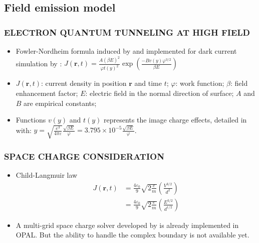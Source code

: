 \documentclass{beamer}
\begin{document}
\subsection{Field emission model}
\begin{frame}
\frametitle{ELECTRON QUANTUM TUNNELING AT HIGH FIELD}
\begin{itemize}
\item Fowler-Nordheim formula induced by \cite{FN} and implemented for dark current simulation by \cite{DE}: $J(\mathbf{r},t) = \frac{A(\beta E)^2}{\varphi t(y)^2}\exp{(\frac{-B v(y)\varphi^{3/2}}{\beta E})}$
\pause
\item $J(\mathbf{r},t)$: current density in position $\mathbf{r}$ and time $t$; $\varphi$: work function; $\beta$: field enhancement factor; $E$: electric field in the normal direction of surface; $A$ and $B$ are empirical constants;  
\pause
\item Functions $v(y)$ and $t(y)$ represents the image charge effects, detailed in \cite{BC} with: $y = \sqrt{\frac{e^3}{4\pi\varepsilon}}\frac{\sqrt{\beta E}}{\varphi} = 3.795\times10^{-5}\frac{\sqrt{\beta E}}{\varphi}$.
\end{itemize}
\end{frame}
\begin{frame}
\frametitle{SPACE CHARGE CONSIDERATION}
\begin{itemize}
\item Child-Langmuir law
\pause
\begin{align*}
J(\mathbf{r},t) & =\frac{4\varepsilon_0}{9}\sqrt{2\frac{e}{m}}(\frac{V^{3/2}}{d^2})\\
 & =\frac{4\varepsilon_0}{9}\sqrt{2\frac{e}{m}}(\frac{E^{3/2}}{d^{1/2}})
\end{align*}
\pause
\item A multi-grid space charge solver developed by \cite{SV} is already implemented in OPAL. But the ability to handle the complex boundary is not available yet.

\end{itemize}
\end{frame}
\end{document}
